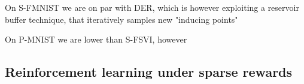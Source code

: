 \documentclass{article}
\newcommand{\our}{\textsc{sfr}\xspace}
\begin{document}
On S-FMNIST we are on par with DER, which is however exploiting a reservoir buffer technique, that iteratively samples new "inducing points"

On P-MNIST we are lower than S-FSVI, however %





\subsection{Reinforcement learning under sparse rewards}
\label{sec:rl-exp}




\end{document}
